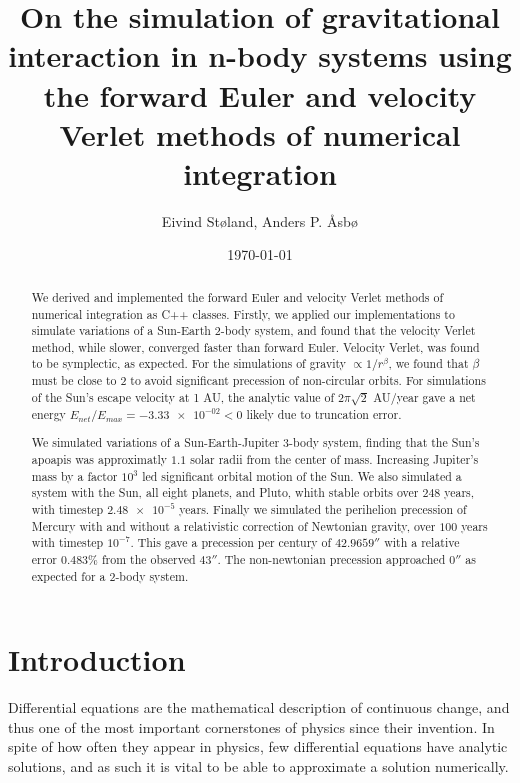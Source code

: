 \documentclass[reprint,english,notitlepage]{revtex4-1}  %
\begin{document}
\title{On the simulation of gravitational interaction in n-body systems using the forward Euler and velocity Verlet methods of numerical integration}   %
\author{Eivind Støland, Anders P. Åsbø}               %
\date{\today}                             %
\noaffiliation                            %

\begin{abstract}
We derived and implemented the forward Euler and velocity Verlet methods of numerical integration as C++ classes. Firstly, we applied our implementations to simulate variations of a Sun-Earth \(2\)-body system, and found that the velocity Verlet method, while slower, converged faster than forward Euler. Velocity Verlet, was found to be symplectic, as expected. For the simulations of gravity \(\propto 1/r^{\beta}\), we found that \(\beta\) must be close to \(2\) to avoid significant precession of non-circular orbits. For simulations of the Sun's escape velocity at 1 AU, the analytic value of \(2\pi\sqrt{2}\) AU/year gave a net energy \(E_{net}/E_{max} = \num{-3.33e-02} < 0\) likely due to truncation error.

We simulated variations of a Sun-Earth-Jupiter \(3\)-body system, finding that the Sun's apoapis was approximatly \(1.1\) solar radii from the center of mass. Increasing Jupiter's mass by a factor \(10^{3}\) led significant orbital motion of the Sun. We also simulated a system with the Sun, all eight planets, and Pluto, whith stable orbits over \(248\) years, with timestep \(\num{2.48e-5}\) years. Finally we simulated the perihelion precession of Mercury with and without a relativistic correction of Newtonian gravity, over \(100\) years with timestep \(10^{-7}\). This gave a precession per century of \(42.9659''\) with a relative error \(0.483 \%\) from the observed \(43''\). The non-newtonian precession approached \(0''\) as expected for a \(2\)-body system.
\end{abstract}

\maketitle                                %


\tableofcontents

\section{Introduction} \label{sec:I}
Differential equations are the mathematical description of continuous change, and thus one of the most important cornerstones of physics since their invention. In spite of how often they appear in physics, few differential equations have analytic solutions, and as such it is vital to be able to approximate a solution numerically.
\end{document}
